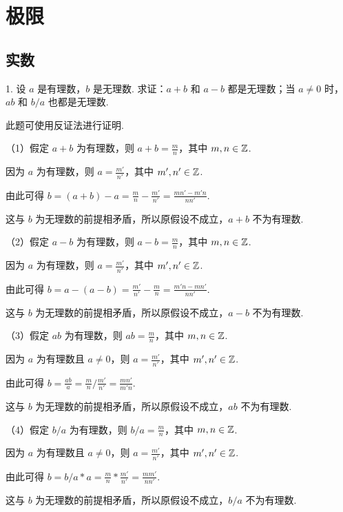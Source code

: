 \documentclass[12pt, a4paper, oneside, UTF8]{ctexbook}
\begin{document}

\fi

\chapter{极限}

\section{实数}

1. 设 $a$ 是有理数，$b$ 是无理数. 求证：$a + b$ 和 $a - b$ 都是无理数；当 $a \neq 0$ 时，$ab$ 和 $b/a$ 也都是无理数.

\begin{solution}
此题可使用反证法进行证明.

（1）假定 $a + b$ 为有理数，则 $\displaystyle a + b = \frac{m}{n}$，其中 $m, n \in \mathbb{Z}$.

因为 $a$ 为有理数，则 $\displaystyle a = \frac{m'}{n'}$，其中 $m', n' \in \mathbb{Z}$.

由此可得 $\displaystyle b = (a + b) - a = \frac{m}{n} - \frac{m'}{n'} = \frac{mn' - m'n}{nn'}$.

这与 $b$ 为无理数的前提相矛盾，所以原假设不成立，$a + b$ 不为有理数.

\vspace{1.5em}

（2）假定 $a - b$ 为有理数，则 $\displaystyle a - b = \frac{m}{n}$，其中 $m, n \in \mathbb{Z}$.

因为 $a$ 为有理数，则 $\displaystyle a = \frac{m'}{n'}$，其中 $m', n' \in \mathbb{Z}$.

由此可得 $\displaystyle b = a - (a - b) = \frac{m'}{n'} - \frac{m}{n} = \frac{m'n - mn'}{nn'}$.

这与 $b$ 为无理数的前提相矛盾，所以原假设不成立，$a - b$ 不为有理数.

\vspace{1.5em}

（3）假定 $ab$ 为有理数，则 $\displaystyle ab = \frac{m}{n}$，其中 $m, n \in \mathbb{Z}$.

因为 $a$ 为有理数且 $a \neq 0$，则 $\displaystyle a = \frac{m'}{n'}$，其中 $m', n' \in \mathbb{Z}$.

由此可得 $\displaystyle b = \frac{ab}{a} = \frac{m}{n}/\frac{m'}{n'} = \frac{mn'}{m'n}$.

这与 $b$ 为无理数的前提相矛盾，所以原假设不成立，$ab$ 不为有理数.

\vspace{1.5em}

（4）假定 $b/a$ 为有理数，则 $\displaystyle b/a = \frac{m}{n}$，其中 $m, n \in \mathbb{Z}$.

因为 $a$ 为有理数且 $a \neq 0$，则 $\displaystyle a = \frac{m'}{n'}$，其中 $m', n' \in \mathbb{Z}$.

由此可得 $\displaystyle b = b/a * a = \frac{m}{n}*\frac{m'}{n'} = \frac{mm'}{nn'}$.

这与 $b$ 为无理数的前提相矛盾，所以原假设不成立，$b/a$ 不为有理数.
\end{solution}
\end{document}
